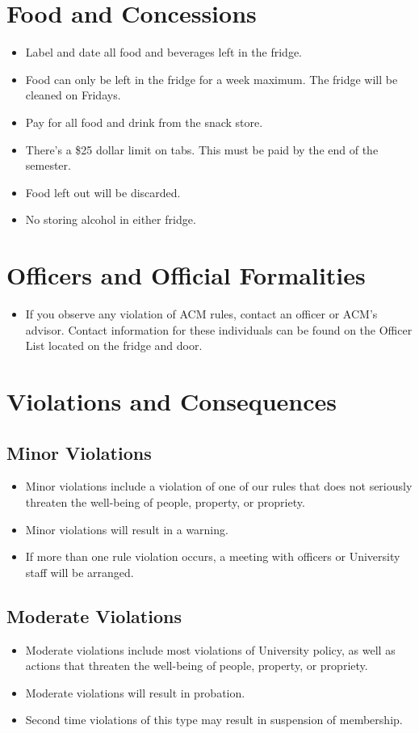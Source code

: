 \section{Food and Concessions}
\begin{itemize}
	\item Label and date all food and beverages left in the fridge.
	\item Food can only be left in the fridge for a week maximum. The fridge will be cleaned on Fridays.
	\item Pay for all food and drink from the snack store.
	\item There’s a \$25 dollar limit on tabs. This must be paid by the end of the semester.
	\item Food left out will be discarded.
	\item No storing alcohol in either fridge.
\end{itemize}

\section{Officers and Official Formalities}
\begin{itemize}
	\item If you observe any violation of ACM rules, contact an officer or ACM's advisor. Contact information for these individuals can be found on the Officer List located on the fridge and door.
\end{itemize}

\section{Violations and Consequences}
\subsection{Minor Violations}
\begin{itemize}
	\item Minor violations include a violation of one of our rules that does not seriously threaten the well-being of people, property, or propriety.
	\item Minor violations will result in a warning.
	\item If more than one rule violation occurs, a meeting with officers or University staff will be arranged.
\end{itemize}

\subsection{Moderate Violations}
\begin{itemize}
	\item Moderate violations include most violations of University policy, as well as actions that threaten the well-being of people, property, or propriety.
	\item Moderate violations will result in probation.
	\item Second time violations of this type may result in suspension of membership.
\end{itemize}

